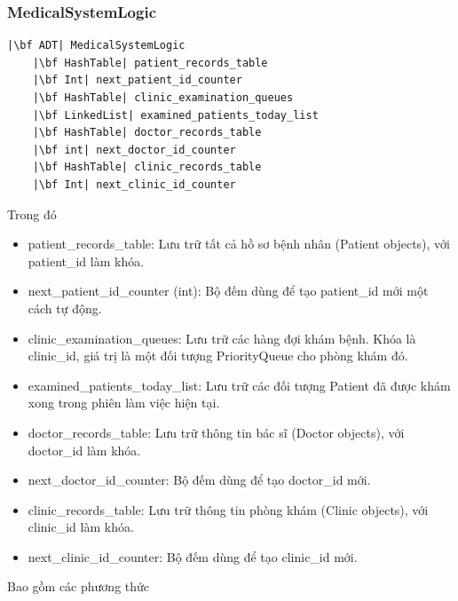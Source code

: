 \newpage
\subsubsection{MedicalSystemLogic}
\begin{verbatim}
|\bf ADT| MedicalSystemLogic
    |\bf HashTable| patient_records_table
    |\bf Int| next_patient_id_counter
    |\bf HashTable| clinic_examination_queues
    |\bf LinkedList| examined_patients_today_list
    |\bf HashTable| doctor_records_table
    |\bf int| next_doctor_id_counter
    |\bf HashTable| clinic_records_table
    |\bf Int| next_clinic_id_counter
\end{verbatim}
Trong đó
\begin{itemize}
    \item patient\_records\_table: Lưu trữ tất cả hồ sơ bệnh nhân (Patient objects), với patient\_id làm khóa.
    \item next\_patient\_id\_counter (int): Bộ đếm dùng để tạo patient\_id mới một cách tự động.
    \item clinic\_examination\_queues: Lưu trữ các hàng đợi khám bệnh. Khóa là clinic\_id, giá trị là một đối tượng PriorityQueue cho phòng khám đó.
    \item examined\_patients\_today\_list: Lưu trữ các đối tượng Patient đã được khám xong trong phiên làm việc hiện tại.
    \item doctor\_records\_table: Lưu trữ thông tin bác sĩ (Doctor objects), với doctor\_id làm khóa.
    \item next\_doctor\_id\_counter: Bộ đếm dùng để tạo doctor\_id mới.
    \item clinic\_records\_table: Lưu trữ thông tin phòng khám (Clinic objects), với clinic\_id làm khóa.
    \item next\_clinic\_id\_counter: Bộ đếm dùng để tạo clinic\_id mới.
\end{itemize}
Bao gồm các phương thức
